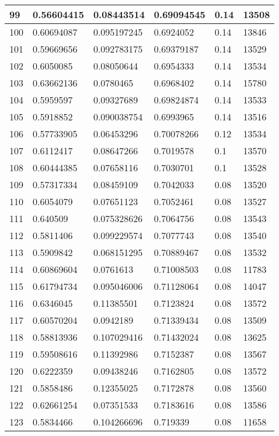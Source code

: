 \begin{longtable}{|l|l|l|l|l|l|}
99 & 0.56604415 & 0.08443514 & 0.69094545 & 0.14 & 13508 \\ \hline 
100 & 0.60694087 & 0.095197245 & 0.6924052 & 0.14 & 13846 \\ \hline 
101 & 0.59669656 & 0.092783175 & 0.69379187 & 0.14 & 13529 \\ \hline 
102 & 0.6050085 & 0.08050644 & 0.6954333 & 0.14 & 13534 \\ \hline 
103 & 0.63662136 & 0.0780465 & 0.6968402 & 0.14 & 15780 \\ \hline 
104 & 0.5959597 & 0.09327689 & 0.69824874 & 0.14 & 13533 \\ \hline 
105 & 0.5918852 & 0.090038754 & 0.6993965 & 0.14 & 13516 \\ \hline 
106 & 0.57733905 & 0.06453296 & 0.70078266 & 0.12 & 13534 \\ \hline 
107 & 0.6112417 & 0.08647266 & 0.7019578 & 0.1 & 13570 \\ \hline 
108 & 0.60444385 & 0.07658116 & 0.7030701 & 0.1 & 13528 \\ \hline 
109 & 0.57317334 & 0.08459109 & 0.7042033 & 0.08 & 13520 \\ \hline 
110 & 0.6054079 & 0.07651123 & 0.7052461 & 0.08 & 13527 \\ \hline 
111 & 0.640509 & 0.075328626 & 0.7064756 & 0.08 & 13543 \\ \hline 
112 & 0.5811406 & 0.099229574 & 0.7077743 & 0.08 & 13540 \\ \hline 
113 & 0.5909842 & 0.068151295 & 0.70889467 & 0.08 & 13532 \\ \hline 
114 & 0.60869604 & 0.0761613 & 0.71008503 & 0.08 & 11783 \\ \hline 
115 & 0.61794734 & 0.095046006 & 0.71128064 & 0.08 & 14047 \\ \hline 
116 & 0.6346045 & 0.11385501 & 0.7123824 & 0.08 & 13572 \\ \hline 
117 & 0.60570204 & 0.0942189 & 0.71339434 & 0.08 & 13509 \\ \hline 
118 & 0.58813936 & 0.107029416 & 0.71432024 & 0.08 & 13625 \\ \hline 
119 & 0.59508616 & 0.11392986 & 0.7152387 & 0.08 & 13567 \\ \hline 
120 & 0.6222359 & 0.09438246 & 0.7162805 & 0.08 & 13572 \\ \hline 
121 & 0.5858486 & 0.12355025 & 0.7172878 & 0.08 & 13560 \\ \hline 
122 & 0.62661254 & 0.07351533 & 0.7183616 & 0.08 & 13586 \\ \hline 
123 & 0.5834466 & 0.104266696 & 0.719339 & 0.08 & 11658 \\ \hline 

\end{longtable}
